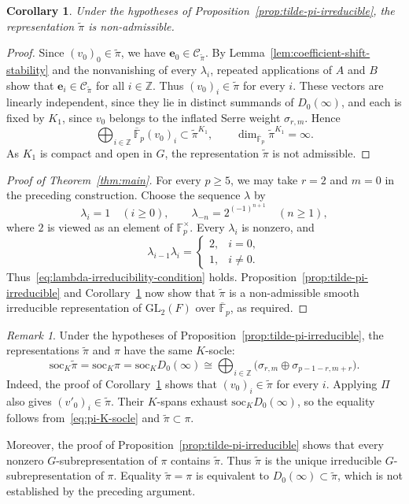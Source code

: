 \documentclass[10pt]{article}
\theoremstyle{plain}
\newtheorem{corollary}[theorem]{Corollary}
\theoremstyle{definition}
\theoremstyle{remark}
\newtheorem{remark}[theorem]{Remark}
\newcommand{\Fp}{\mathbb{F}_p}
\newcommand{\Fpbar}{\overline{\mathbb{F}}_p}
\newcommand{\GL}{\mathrm{GL}}
\newcommand{\soc}{\mathrm{soc}}
\begin{document}
\begin{corollary}\label{cor:tilde-pi-non-admissible}
Under the hypotheses of Proposition~\ref{prop:tilde-pi-irreducible}, the representation $\widetilde\pi$ is non-admissible.
\end{corollary}

\begin{proof}
Since $(v_0)_0\in\widetilde\pi$, we have $\mathbf e_0\in\mathcal C_{\widetilde\pi}$. By Lemma~\ref{lem:coefficient-shift-stability} and the nonvanishing of every $\lambda_i$, repeated applications of $A$ and $B$ show that $\mathbf e_i\in\mathcal C_{\widetilde\pi}$ for all $i\in\mathbb{Z}$. Thus $(v_0)_i\in\widetilde\pi$ for every $i$. These vectors are linearly independent, since they lie in distinct summands of $D_0(\infty)$, and each is fixed by $K_1$, since $v_0$ belongs to the inflated Serre weight $\sigma_{r,m}$. Hence
\[
\bigoplus_{i\in\mathbb{Z}}\Fpbar(v_0)_i
\subset\widetilde\pi^{K_1},\qquad
\dim_{\Fpbar}\widetilde\pi^{K_1}=\infty.
\]
As $K_1$ is compact and open in $G$, the representation $\widetilde\pi$ is not admissible.
\end{proof}

\begin{proof}[Proof of Theorem~\ref{thm:main}]
For every $p\geq5$, we may take $r=2$ and $m=0$ in the preceding construction. Choose the sequence $\lambda$ by
\[
\lambda_i=1\quad(i\geq0),\qquad
\lambda_{-n}=2^{(-1)^{n+1}}\quad(n\geq1),
\]
where $2$ is viewed as an element of $\Fp^\times$. Every $\lambda_i$ is nonzero, and
\[
\lambda_{i-1}\lambda_i=
\begin{cases}
2,&i=0,\\
1,&i\ne0.
\end{cases}
\]
Thus~\eqref{eq:lambda-irreducibility-condition} holds. Proposition~\ref{prop:tilde-pi-irreducible} and Corollary~\ref{cor:tilde-pi-non-admissible} now show that $\widetilde\pi$ is a non-admissible smooth irreducible representation of $\GL_2(F)$ over $\Fpbar$, as required.
\end{proof}

\begin{remark}\label{rem:tilde-pi-socle-and-pi}
Under the hypotheses of Proposition~\ref{prop:tilde-pi-irreducible}, the representations $\widetilde\pi$ and $\pi$ have the same $K$-socle:
\[
\soc_K\widetilde\pi=\soc_K\pi=\soc_K D_0(\infty)
\cong\bigoplus_{i\in\mathbb Z}
\bigl(\sigma_{r,m}\oplus\sigma_{p-1-r,m+r}\bigr).
\]
Indeed, the proof of Corollary~\ref{cor:tilde-pi-non-admissible} shows that $(v_0)_i\in\widetilde\pi$ for every $i$. Applying $\Pi$ also gives $(v'_0)_i\in\widetilde\pi$. Their $K$-spans exhaust $\soc_K D_0(\infty)$, so the equality follows from~\eqref{eq:pi-K-socle} and $\widetilde\pi\subset\pi$.

Moreover, the proof of Proposition~\ref{prop:tilde-pi-irreducible} shows that every nonzero $G$-subrepresentation of $\pi$ contains $\widetilde\pi$. Thus $\widetilde\pi$ is the unique irreducible $G$-subrepresentation of $\pi$. Equality $\widetilde\pi=\pi$ is equivalent to $D_0(\infty)\subset\widetilde\pi$, which is not established by the preceding argument.
\end{remark}
\end{document}
